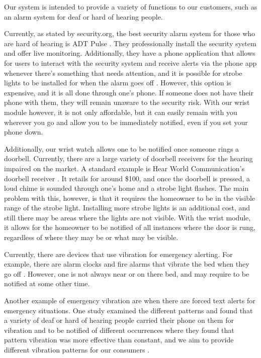 Our system is intended to provide a variety of functions to our customers, such as an alarm system for deaf or hard of hearing people.

Currently, as stated by security.org, the best security alarm system for those who are hard of hearing is ADT Pulse \cite{Vigderman2021}. They professionally install the security system and offer live monitoring. Additionally, they have a phone application that allows for users to interact with the security system and receive alerts via the phone app whenever there’s something that needs attention, and it is possible for strobe lights to be installed for when the alarm goes off \cite{Zions2019}. However, this option is expensive, and it is all done through one’s phone. If someone does not have their phone with them, they will remain unaware to the security risk. With our wrist module however, it is not only affordable, but it can easily remain with you wherever you go and allow you to be immediately notified, even if you set your phone down.

Additionally, our wrist watch allows one to be notified once someone rings a doorbell. Currently, there are a large variety of doorbell receivers for the hearing impaired on the market. A standard example is Hear World Communication's doorbell receiver \cite{HearWorldStrobe}. It retails for around \$100, and once the doorbell is pressed, a loud chime is sounded through one’s home and a strobe light flashes. The main problem with this, however, is that it requires the homeowner to be in the visible range of the strobe light. Installing more strobe lights is an additional cost, and still there may be areas where the lights are not visible. With the wrist module, it allows for the homeowner to be notified of all instances where the door is rung, regardless of where they may be or what may be visible.

Currently, there are devices that use vibration for emergency alerting. For example, there are alarm clocks and fire alarms that vibrate the bed when they go off \cite{WalmartAlarm} \cite{AllegroFire}. However, one is not always near or on there bed, and may require to be notified at some other time.

Another example of emergency vibration are when there are forced text alerts for emergency situations. One study examined the different patterns and found that a variety of deaf or hard of hearing people carried their phone on them for vibration and to be notified of different occurrences where they found that pattern vibration was more effective than constant, and we aim to provide different vibration patterns for our consumers \cite{Harkins2010}.